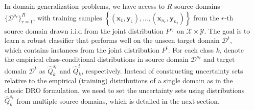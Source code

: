 \documentclass[journal]{IEEEtran}
\begin{document}
In domain generalization problems, we have access to $R$ source domains $\{\mathcal{D}^{s_r}\}_{r=1}^R$, with training samples $\left\{\left(\boldsymbol{x}_{1}, \boldsymbol{y}_{1}\right),\ldots,\left(\boldsymbol{x}_{n_r}, \boldsymbol{y}_{n_r}\right)\right\}$ from the $r$-th source domain drawn i.i.d from the joint distribution ${P}^{s_r}$ on $\mathcal{X}\times\mathcal{Y}$.
The goal is to learn a robust classifier that performs well on the unseen target domain $\mathcal{D}^t$,
which contains instances from the joint distribution ${P}^t$. 
For each class $k$, denote the empirical class-conditional distributions in source domain $\mathcal{D}^{s_r}$ and target domain $\mathcal{D}^{t}$ as $\widehat{Q}^{s_r}_k$ and $\widehat{Q}^{t}_k$, respectively.
Instead of constructing uncertainty sets relative to the  empirical (training) distributions of a single domain as in the classic DRO formulation, 
we need to set the uncertainty sets using distributions $\widehat{Q}_k^{s_r}$ from multiple source domains, which is detailed in the next section.
\end{document}
